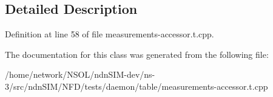 \subsection{Detailed Description}


Definition at line 58 of file measurements-\/accessor.\+t.\+cpp.



The documentation for this class was generated from the following file\+:\begin{DoxyCompactItemize}
\item 
/home/network/\+N\+S\+O\+L/ndn\+S\+I\+M-\/dev/ns-\/3/src/ndn\+S\+I\+M/\+N\+F\+D/tests/daemon/table/measurements-\/accessor.\+t.\+cpp\end{DoxyCompactItemize}
